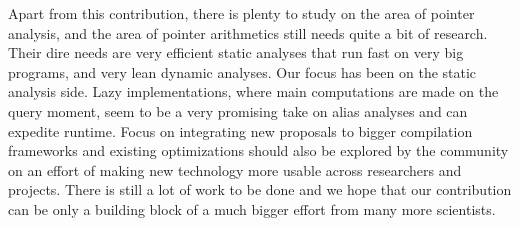 \documentclass[12pt]{article}
\begin{document}
Apart from this contribution, there is plenty to study on the area of 
pointer analysis, and the area of pointer arithmetics still needs quite a bit 
of research. Their dire needs are very efficient static analyses that run fast on 
very big programs, and very lean dynamic analyses. Our focus has 
been on the static analysis side. Lazy implementations, where main computations 
are made on the query moment, seem to be a very promising take on alias 
analyses and can expedite runtime. Focus on integrating new proposals to 
bigger compilation frameworks and existing optimizations should also be explored 
by the community on an effort of making new technology more usable across 
researchers and projects. There is still a lot of work to be done and we hope 
that our contribution can be only a building block of a much bigger effort from 
many more scientists.



\end{document}

